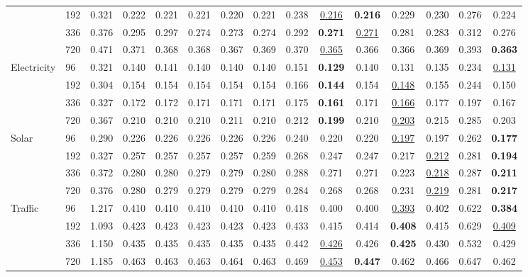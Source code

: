 \begin{tabular}{llccccccccccccc}
 & 192 & 0.321 & 0.222 & 0.221 & 0.221 & 0.220 & 0.221 & 0.238 & \underline{0.216} & \textbf{0.216} & 0.229 & 0.230 & 0.276 & 0.224 \\
 & 336 & 0.376 & 0.295 & 0.297 & 0.274 & 0.273 & 0.274 & 0.292 & \textbf{0.271} & \underline{0.271} & 0.281 & 0.283 & 0.312 & 0.276 \\
 & 720 & 0.471 & 0.371 & 0.368 & 0.368 & 0.367 & 0.369 & 0.370 & \underline{0.365} & 0.366 & 0.366 & 0.369 & 0.393 & \textbf{0.363} \\
\midrule
Electricity & 96 & 0.321 & 0.140 & 0.141 & 0.140 & 0.140 & 0.140 & 0.151 & \textbf{0.129} & 0.140 & 0.131 & 0.135 & 0.234 & \underline{0.131} \\
 & 192 & 0.304 & 0.154 & 0.154 & 0.154 & 0.154 & 0.154 & 0.166 & \textbf{0.144} & 0.154 & \underline{0.148} & 0.155 & 0.244 & 0.150 \\
 & 336 & 0.327 & 0.172 & 0.172 & 0.171 & 0.171 & 0.171 & 0.175 & \textbf{0.161} & 0.171 & \underline{0.166} & 0.177 & 0.197 & 0.167 \\
 & 720 & 0.367 & 0.210 & 0.210 & 0.210 & 0.211 & 0.210 & 0.212 & \textbf{0.199} & 0.210 & \underline{0.203} & 0.215 & 0.285 & 0.203 \\
\midrule
Solar & 96 & 0.290 & 0.226 & 0.226 & 0.226 & 0.226 & 0.226 & 0.240 & 0.220 & 0.220 & \underline{0.197} & 0.197 & 0.262 & \textbf{0.177} \\
 & 192 & 0.327 & 0.257 & 0.257 & 0.257 & 0.257 & 0.259 & 0.268 & 0.247 & 0.247 & 0.217 & \underline{0.212} & 0.281 & \textbf{0.194} \\
 & 336 & 0.372 & 0.280 & 0.280 & 0.279 & 0.279 & 0.280 & 0.288 & 0.271 & 0.271 & 0.223 & \underline{0.218} & 0.287 & \textbf{0.211} \\
 & 720 & 0.376 & 0.280 & 0.279 & 0.279 & 0.279 & 0.279 & 0.284 & 0.268 & 0.268 & 0.231 & \underline{0.219} & 0.281 & \textbf{0.217} \\
\midrule
Traffic & 96 & 1.217 & 0.410 & 0.410 & 0.410 & 0.410 & 0.410 & 0.418 & 0.400 & 0.400 & \underline{0.393} & 0.402 & 0.622 & \textbf{0.384} \\
 & 192 & 1.093 & 0.423 & 0.423 & 0.423 & 0.423 & 0.423 & 0.433 & 0.415 & 0.414 & \textbf{0.408} & 0.415 & 0.629 & \underline{0.409} \\
 & 336 & 1.150 & 0.435 & 0.435 & 0.435 & 0.435 & 0.435 & 0.442 & \underline{0.426} & 0.426 & \textbf{0.425} & 0.430 & 0.532 & 0.429 \\
 & 720 & 1.185 & 0.463 & 0.463 & 0.463 & 0.464 & 0.463 & 0.469 & \underline{0.453} & \textbf{0.447} & 0.462 & 0.466 & 0.647 & 0.462 \\

\end{tabular}
